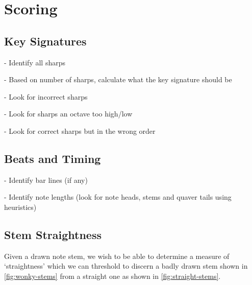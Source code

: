 \section{Scoring}
\label{sec:scoring}
\subsection{Key Signatures}

- Identify all sharps

- Based on number of sharps, calculate what the key signature should be

- Look for incorrect sharps

- Look for sharps an octave too high/low

- Look for correct sharps but in the wrong order

\subsection{Beats and Timing}

- Identify bar lines (if any)

- Identify note lengths (look for note heads, stems and quaver tails using heuristics)

\subsection{Stem Straightness}

Given a drawn note stem, we wish to be able to determine a measure of `straightness' which we can threshold to discern a badly drawn stem shown in \cref{fig:wonky-stems} from a straight one  as shown in \cref{fig:straight-stems}.

